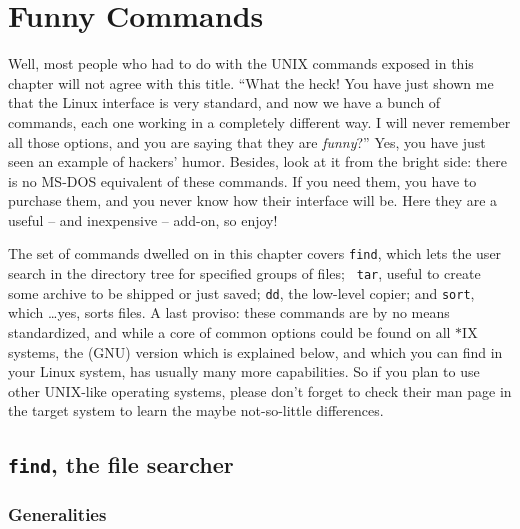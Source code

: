 %
%
%
%
\chapter{Funny Commands}\label{funny-chapter}

Well, most people who had to do with the UNIX commands exposed in this
chapter will not agree with this title. ``What the heck! You have just
shown me that the Linux interface is very standard, and now we have a
bunch of commands, each one working in a completely different way. I will
never remember all those options, and you are saying that they are {\em
funny}\/?'' Yes, you have just seen an example of hackers' humor. Besides,
look at it from the bright side: there is no MS-DOS equivalent of these
commands. If you need them, you have to purchase them, and you never know
how their interface will be. Here they are a useful -- and inexpensive --
add-on, so enjoy!

The set of commands dwelled on in this chapter covers {\tt find}, which lets
the user search in the directory tree for specified groups of files; {\tt
tar}, useful to create some archive to be shipped or just saved; {\tt dd},
the low-level copier; and {\tt sort}, which \ldots yes, sorts files. A
last proviso: these commands are by no means standardized, and while a
core of common options could be found on all $*$IX systems, the (GNU)
version which is explained below, and which you can find in your Linux 
system, has usually many more capabilities. So if you plan to use other
UNIX-like operating systems, please don't forget to check their man page
in the target system to learn the maybe not-so-little differences.

\section{{\tt find}, the file searcher}

\subsection{Generalities}

